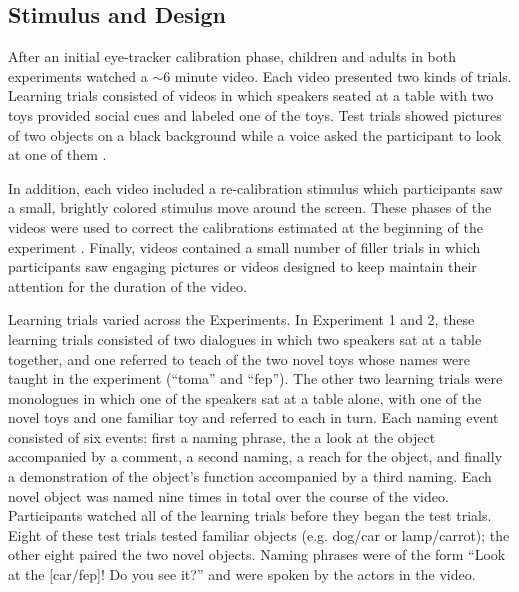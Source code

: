 \documentclass{pnastwo}
\begin{document}
\begin{article}
\begin{materials}
\subsection{Stimulus and Design} After an initial eye-tracker calibration phase, children and adults in both experiments watched a $\sim$6 minute video. Each video presented two kinds of trials. Learning trials consisted of videos in which speakers seated at a table with two toys provided social cues and labeled one of the toys. Test trials showed pictures of two objects on a black background while a voice asked the participant to look at one of them \cite[as in][]{fernald1998}.

In addition, each video included a re-calibration stimulus which participants saw a small, brightly colored stimulus move around the screen. These phases of the videos were used to correct the calibrations estimated at the beginning of the experiment \cite[see][]{frank2012}. Finally, videos contained a small number of filler trials in which participants saw engaging pictures or videos designed to keep maintain their attention for the duration of the video.

Learning trials varied across the Experiments. In Experiment 1 and 2, these learning trials consisted of two dialogues in which two speakers sat at a table together, and one referred to teach of the two novel toys whose names were taught in the experiment (``toma'' and ``fep''). The other two learning trials were monologues in which one of the speakers sat at a table alone, with one of the novel toys and one familiar toy and referred to each in turn. Each naming event consisted of six events: first a naming phrase, the a look at the object accompanied by a comment, a second naming, a reach for the object, and finally a demonstration of the object's function accompanied by a third naming. Each novel object was named nine times in total over the course of the video. Participants watched all of the learning trials before they began the test trials. Eight of these test trials tested familiar objects (e.g. dog/car or lamp/carrot); the other eight paired the two novel objects. Naming phrases were of the form ``Look at the [car/fep]! Do you see it?'' and were spoken by the actors in the video.



\end{materials}
\end{article}
\end{document}
